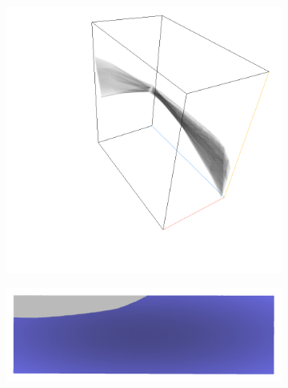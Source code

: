 \documentclass[a4paper,fontsize=12pt,toc=bib,halfparskip]{scrartcl}
\begin{document}
\begin{figure}
	\begin{subfigure}{0.4\textwidth}
		\centering
		\includegraphics[width=\textwidth]{pictures/results/Beam/Beam_InvariantSpace1.png}
		\subcaption{}
		\label{BeamInvariant1}
	\end{subfigure}
	\hspace*{\fill}
	\begin{subfigure}{0.4\textwidth}
		\centering
		\includegraphics[width=\textwidth]{pictures/results/Beam/Beam_Object1.png}
		\subcaption{}
		\label{BeamObject1}
	\end{subfigure}
	\medskip
	\begin{subfigure}{0.4\textwidth}
		\centering

\end{subfigure}
\end{figure}
\end{document}
